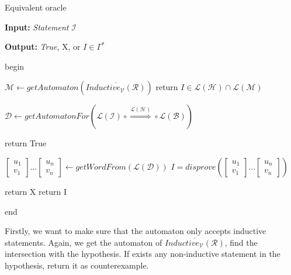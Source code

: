 \begin{algorithm}
    \caption{Equivalent oracle}\label{alg:equivalence}
    \textbf{Input: } \textit{Statement} $\mathcal{I}$ 

    \textbf{Output: } \textit{True}, X, or $I \in \Gamma^*$
    
    begin
    \begin{algorithmic}[1]
        \State $\mathcal{M} \gets getAutomaton(\overline{Inductive_{\mathcal{V}}(\mathcal{R})})$
         
            \State return $I \in \mathcal{L}(\mathcal{H}) \cap \mathcal{L}(\mathcal{M})$
        \EndIf

        \State $\mathcal{D} \leftarrow getAutomatonFor(\mathcal{L}(\mathcal{I}) \circ \overset{\mathcal{L}(\mathcal{H})}{\Rightarrow} \circ \mathcal{L}(\mathcal{B})) $

            \State return True
        \EndIf

        \State $[\substack{u_1 \\ v_1}] \dots [\substack{u_n \\ v_n}] \leftarrow getWordFrom(\mathcal{L}(\mathcal{D}))$
        \State $I = disprove([\substack{u_1 \\ v_1}] \dots [\substack{u_n \\ v_n}])$
        
            \State return X 
        \EndIf
        \State return I
    \end{algorithmic}
    end
\end{algorithm}

Firstly, we want to make sure that the automaton only accepts 
inductive statements. 
Again, we get the automaton of $\overline{Inductive_{\mathcal{V}}(\mathcal{R})}$,
find the intersection with the hypothesis.
If exists any non-inductive statement in the hypothesis,
return it as counterexample.

